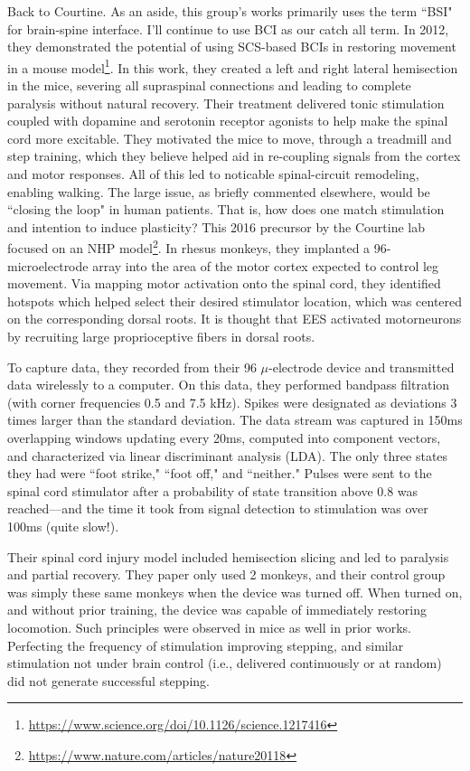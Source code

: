 Back to Courtine. As an aside, this group's works primarily uses the term ``BSI" for brain-spine interface. I'll continue to use BCI as our catch all term. In 2012, they demonstrated the potential of using SCS-based BCIs in restoring movement in a mouse model\footnote{\url{https://www.science.org/doi/10.1126/science.1217416}}. In this work, they created a left and right lateral hemisection in the mice, severing all supraspinal connections and leading to complete paralysis without natural recovery. Their treatment delivered tonic stimulation coupled with dopamine and serotonin receptor agonists to help make the spinal cord more excitable. They motivated the mice to move, through a treadmill and step training, which they believe helped aid in re-coupling signals from the cortex and motor responses. All of this led to noticable spinal-circuit remodeling, enabling walking. The large issue, as briefly commented elsewhere, would be ``closing the loop" in human patients. That is, how does one match stimulation and intention to induce plasticity? This 2016 precursor by the Courtine lab focused on an NHP model\footnote{\url{https://www.nature.com/articles/nature20118}}. In rhesus monkeys, they implanted a 96-microelectrode array into the area of the motor cortex expected to control leg movement. Via mapping motor activation onto the spinal cord, they identified hotspots which helped select their desired stimulator location, which  was centered on the corresponding dorsal roots. It is thought that EES activated motorneurons by recruiting large proprioceptive fibers in dorsal roots.\newline

To capture data, they recorded from their 96 $\mu$-electrode device and transmitted data wirelessly to a computer. On this data, they performed bandpass filtration (with corner frequencies 0.5 and 7.5 kHz). Spikes were designated as deviations 3 times larger than the standard deviation. The data stream was captured in 150ms overlapping windows updating every 20ms, computed into component vectors, and characterized via linear discriminant analysis (LDA). The only three states they had were ``foot strike," ``foot off," and ``neither." Pulses were sent to the spinal cord stimulator after a probability of state transition above 0.8 was reached---and the time it took from signal detection to stimulation was over 100ms (quite slow!).\newline

Their spinal cord injury model included hemisection slicing and led to paralysis and partial recovery. They paper only used 2 monkeys, and their control group was simply these same monkeys when the device was turned off. When turned on, and without prior training, the device was capable of immediately restoring locomotion. Such principles were observed in mice as well in prior works. Perfecting the frequency of stimulation improving stepping, and similar stimulation not under brain control (i.e., delivered continuously or at random) did not generate successful stepping.  \newline

